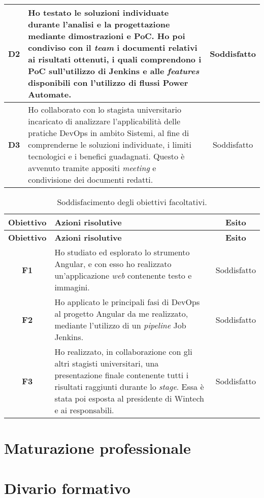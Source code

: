\begin{longtable}{|c|p{8cm}|c|}
    \hline \textbf{D2}  & Ho testato le soluzioni individuate durante l'analisi e la progettazione mediante dimostrazioni e PoC. Ho poi condiviso con il \emph{team} i documenti relativi ai risultati ottenuti, i quali comprendono i PoC sull'utilizzo di Jenkins e alle \emph{features} disponibili con l'utilizzo di flussi Power Automate. & Soddisfatto\\
    \hline \textbf{D3}  & Ho collaborato con lo stagista universitario incaricato di analizzare l'applicabilità delle pratiche \gls{DevOps} in ambito \gls{Sistemi}, al fine di comprenderne le soluzioni individuate, i limiti tecnologici e i benefici guadagnati. Questo è avvenuto tramite appositi \emph{meeting} e condivisione dei documenti redatti. & Soddisfatto\\
\end{longtable}

\begin{longtable}{|c|p{8cm}|c|}
    \caption{Soddisfacimento degli obiettivi facoltativi.}
    \label{tab:soddObbFacoltativi}\\
    \hline \textbf{Obiettivo} & \textbf{Azioni risolutive} & \textbf{Esito}\\  \endfirsthead
    \hline \textbf{Obiettivo} & \textbf{Azioni risolutive} & \textbf{Esito}\\  \endhead
    \hline \endfoot
    \hline \endlastfoot
    \hline \textbf{F1}  & Ho studiato ed esplorato lo strumento Angular, e con esso ho realizzato un'applicazione \emph{web} contenente testo e immagini. & Soddisfatto\\
    \hline \textbf{F2}  & Ho applicato le principali fasi di \gls{DevOps} al progetto Angular da me realizzato, mediante l'utilizzo di un \emph{pipeline} Job Jenkins. & Soddisfatto\\
    \hline \textbf{F3}  & Ho realizzato, in collaborazione con gli altri stagisti universitari, una presentazione finale contenente tutti i risultati raggiunti durante lo \emph{stage}. Essa è stata poi esposta al presidente di Wintech e ai responsabili. & Soddisfatto\\
\end{longtable}
\endgroup

\section{Maturazione professionale}
%

\section{Divario formativo}
%

